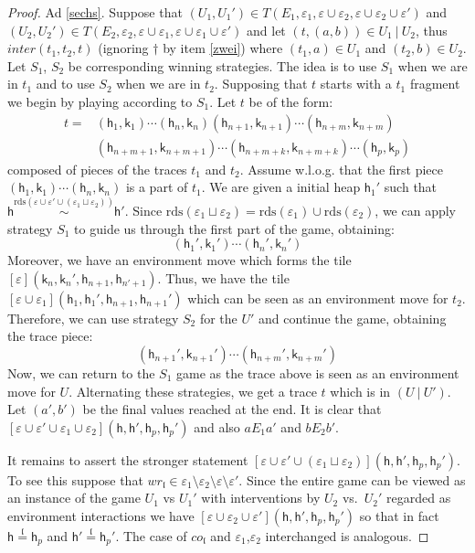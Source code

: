 \documentclass[nocopyrightspace,preprint]{sigplanconf}
\newcommand{\semparallel}{~|~}
\newcommand{\eff}{\varepsilon}
\newcommand{\reads}{\mathrm{rds}}
\newcommand{\rds}{\reads}
\newcommand{\cEff}[1]{\ensuremath{\mathit{co}_{#1}}}
\newcommand{\wEff}[1]{\ensuremath{\mathit{wr}_{#1}}}
\newcommand{\loc}{\mathfrak{l}}
\newcommand\heap{\ensuremath{\mathsf{h}}\xspace}
\newcommand\h{\heap}
\renewcommand\k{\ensuremath{\mathsf{k}}\xspace}
\newcommand\rloc[3]{\ensuremath{#1 \stackrel{#3}{\sim} #2}}
\newcommand\rrloc[3]{\ensuremath{#1 \stackrel{#3}{=} #2}}
\begin{document}
\begin{proof}
Ad \ref{sechs}. Suppose that $(U_1,U_1')\in
T(E_1,\eff_1,\eff\cup\eff_2,\eff\cup\eff_2\cup\eff')$ and $(U_2,U_2')\in T(E_2,\eff_2,\eff\cup\eff_1,\eff\cup\eff_1\cup\eff')$ and let $(t,(a,b))\in U_1\semparallel U_2$,
thus $\textit{inter}(t_1,t_2,t)$ (ignoring $\dagger$ by item
\ref{zwei}) where $(t_1,a)\in U_1$ and $(t_2,b)\in U_2$. Let $S_1$,
$S_2$ be corresponding winning strategies.  The idea is to use $S_1$
when we are in $t_1$ and to use $S_2$ when we are in $t_2$. Supposing
that $t$ starts with a $t_1$ fragment we begin by playing according to $S_1$. Let $t$ be of the form:
\[
\begin{array}{ll}
  t = & (\h_1,\k_1) \cdots (\h_n,\k_n) (\h_{n+1},\k_{n+1}) \cdots (\h_{n+m},\k_{n+m})\\ & (\h_{n+m+1},\k_{n+m+1}) \cdots (\h_{n+m+k},\k_{n+m+k})  \cdots (\h_p,\k_p)  
\end{array}
\]
composed of pieces of the traces $t_1$ and $t_2$. Assume w.l.o.g. that the first piece $(\h_1,\k_1) \cdots (\h_n,\k_n)$ is a part of $t_1$. We are given a initial heap $\h_1'$ such that $\rloc{\h}{\h'}{\rds(\eff\cup\eff'\cup(\eff_1\sqcup\eff_2))}$. Since $\rds(\eff_1\sqcup\eff_2)=\rds(\eff_1)\cup\rds(\eff_2)$, we can apply strategy $S_1$ to guide us through the first part of the game, obtaining:
\[
  (\h_1',\k_1') \cdots (\h_n',\k_n')
\]
Moreover, we have an environment move which forms the tile $[\eff](\k_n,\k_n',\h_{n+1},\h_{n'+1})$. Thus, we have the tile $[\eff \cup \eff_1](\h_1,\h_1',\h_{n+1},\h_{n+1}')$ which can be seen as an environment move for $t_2$. Therefore, we can use strategy $S_2$ for the $U'$ and continue the game, obtaining the trace piece:
\[
  (\h_{n+1}',\k_{n+1}') \cdots (\h_{n+m}',\k_{n+m}')
\]
Now, we can return to the $S_1$ game as the trace above is seen as an environment move for $U$. Alternating these strategies, we get a trace $t$ which is in $(U \semparallel U')$. Let $(a',b')$ be the final values reached at the end. It is clear that $[\eff\cup\eff'\cup\eff_1\cup\eff_2](\h,\h',\h_p,\h_p')$ and also $aE_1a'$ and $bE_2b'$. 

It remains to assert the stronger statement  $[\eff\cup\eff'\cup(\eff_1\sqcup\eff_2)](\h,\h',\h_p,\h_p')$. To see this suppose that $\wEff\loc\in\eff_1\setminus \eff_2\setminus\eff\setminus\eff'$. 
Since the entire game can be viewed as an instance of the game $U_1$ vs $U_1'$ with interventions by $U_2$ vs.\ $U_2'$ regarded as environment interactions we have $[\eff\cup\eff_2\cup\eff'](\h,\h',\h_p,\h_p')$ so that in fact 
$\rrloc{\h}{\h_p}{\loc}$ and $\rrloc{\h'}{\h_p'}{\loc}$. The case of $\cEff{\loc}$ and $\eff_1$,$\eff_2$ interchanged is analogous.
\end{proof}
\end{document}
